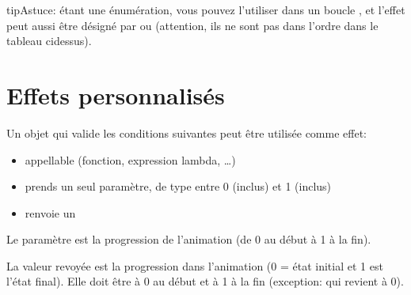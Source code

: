 \documentclass[letterpaper,10pt,french]{sphinxmanual}
\begin{document}
\begin{sphinxadmonition}{tip}{Astuce:}
\sphinxAtStartPar
{} étant une énumération, vous pouvez l’utiliser dans un boucle , et l’effet  peut aussi être désigné par  ou  (attention, ils ne sont pas dans l’ordre dans le tableau ci\sphinxhyphen{}dessus).
\end{sphinxadmonition}


\section{Effets personnalisés}
\label{\detokenize{effects:effets-personnalises}}\label{\detokenize{effects:customeffects}}
\sphinxAtStartPar
Un objet qui valide les conditions suivantes peut être utilisée comme effet:
\begin{itemize}
\item {} 
\sphinxAtStartPar
appellable (fonction, expression lambda, …)

\item {} 
\sphinxAtStartPar
prends un seul paramètre, de type  entre 0 (inclus) et 1 (inclus)

\item {} 
\sphinxAtStartPar
renvoie un 

\end{itemize}

\sphinxAtStartPar
Le paramètre est la progression  de l’animation (de 0 au début à 1 à la fin).

\sphinxAtStartPar
La valeur revoyée est la progression dans l’animation (0 = état initial et 1 est l’état final). Elle doit être à 0 au début et à 1 à la fin (exception:  qui revient à 0).



\renewcommand{\indexname}{Index}
\printindex
\end{document}
